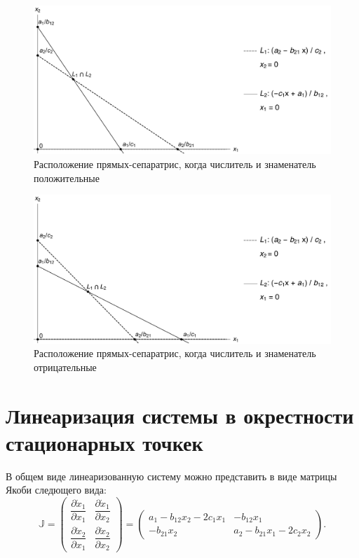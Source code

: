 \documentclass[12pt,a4paper]{article}
\begin{document}
    \begin{figure}
        \centering
        \includegraphics[width=\textwidth]{sep_1.pdf}
        \caption{Расположение прямых-сепаратрис, когда числитель и знаменатель положительные}
        \label{fig:sep_1}
    \end{figure}

    \begin{figure}
        \centering
        \includegraphics[width=\textwidth]{sep_2.pdf}
        \caption{Расположение прямых-сепаратрис, когда числитель и знаменатель отрицательные}
        \label{fig:sep_2}
    \end{figure}

    \pagebreak

    \section{Линеаризация системы в окрестности стационарных точкек}
    В общем виде линеаризованную систему можно представить в виде матрицы Якоби следющего вида: 
    \begin{equation}
        \label{jacobian}
        \mathbb{J} = 
            \begin{pmatrix}
                \dfrac{\partial{\dot x_1}}{\partial x_1}
                &
                \dfrac{\partial{\dot x_1}}{\partial x_2}
                \\[5mm]
                \dfrac{\partial{\dot x_2}}{\partial x_1}
                &
                \dfrac{\partial{\dot x_2}}{\partial x_2}
            \end{pmatrix}
        =
            \begin{pmatrix}
                a_1 - b_{12} x_2 - 2 c_1 x_1 & -b_{12} x_1
                \\
                -b_{21} x_2 & a_2 - b_{21} x_1 - 2c_2 x_2
            \end{pmatrix}\!.
    \end{equation}
\end{document}
